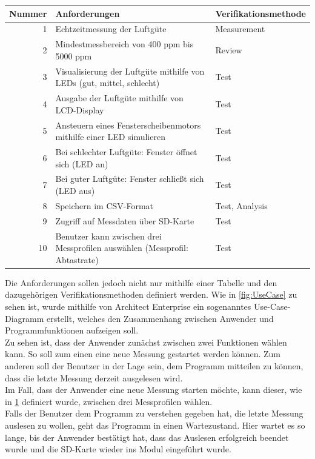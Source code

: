\begin{table}[!hbt]
	
	\centering
	
	\begin{tabular}{|r| p{8.4cm}|p{4.7cm}|}
		
		\hline
		Nummer & Anforderungen & Verifikationsmethode \\
		\hline
		1 & Echtzeitmessung der Luftgüte & Measurement \\
		\hline
		2 & Mindestmessbereich von 400 ppm bis 5000 ppm & Review \\
		\hline
		3 & Visualisierung der Luftgüte mithilfe von LEDs (gut, mittel, schlecht) & Test \\
		\hline
		4 & Ausgabe der Luftgüte mithilfe von \ac{LCD}-Display & Test \\
		\hline
		5 & Ansteuern eines Fensterscheibenmotors mithilfe einer LED simulieren & Test \\
		\hline
		6 & Bei schlechter Luftgüte: Fenster öffnet sich (LED an) & Test \\
		\hline
		7 & Bei guter Luftgüte: Fenster schließt sich (LED aus) & Test \\
		\hline
		8 & Speichern im CSV-Format & Test, Analysis\\
		\hline
		9 & Zugriff auf Messdaten über SD-Karte & Test \\
		\hline
		10 & Benutzer kann zwischen drei Messprofilen auswählen (Messprofil: Abtastrate) & Test \\
		\hline
		
	\end{tabular}
	
	\label{tab:Anforderungen}
	
\end{table}

Die Anforderungen sollen jedoch nicht nur mithilfe einer Tabelle und den dazugehörigen Verifikationsmethoden definiert werden. Wie in \ref{fig:UseCase} zu sehen ist, wurde mithilfe von Architect Enterprise ein sogenanntes Use-Case-Diagramm erstellt, welches den Zusammenhang zwischen Anwender und Programmfunktionen aufzeigen soll. \\
Zu sehen ist, dass der Anwender zunächst zwischen zwei Funktionen wählen kann. So soll zum einen eine neue Messung gestartet werden können. Zum anderen soll der Benutzer in der Lage sein, dem Programm mitteilen zu können, dass die letzte Messung derzeit ausgelesen wird. \\
Im Fall, dass der Anwender eine neue Messung starten möchte, kann dieser, wie in \ref{tab:Anforderungen} definiert wurde, zwischen drei Messprofilen wählen. \\
Falls der Benutzer dem Programm zu verstehen gegeben hat, die letzte Messung auslesen zu wollen, geht das Programm in einen Wartezustand. Hier wartet es so lange, bis der Anwender bestätigt hat, dass das Auslesen erfolgreich beendet wurde und die SD-Karte wieder ins Modul eingeführt wurde. \\

